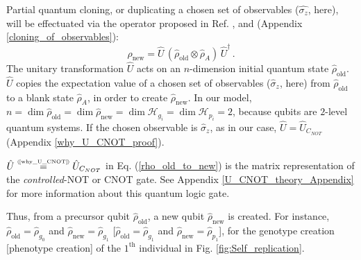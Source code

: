 \documentclass[11pt]{article}
\numberwithin{equation}{section} %
\numberwithin{figure}{section} %
\newcommand\numeq[1] %
  {\stackrel{\scriptscriptstyle(\mkern-1.5mu#1\mkern-1.5mu)}{=}}
\begin{document}

Partial quantum cloning, or duplicating a chosen set of observables ($\hat{\sigma_z}$, here), will be effectuated via the operator proposed in Ref. \cite[p.~2, Eq.~(1b) \& (3c)]{AL_in_QT}, \cite[p.~2, Eq.~(7)]{Bio_Cloning} and \cite[p.~2, l.~19]{Ferraro} (Appendix \ref{cloning_of_observables}):
\begin{equation} \label{rho_old_to_new}
\hat{\rho}_{\textrm{new}} = \hat{U}\,(\hat{\rho}_{\textrm{old}}\otimes\hat{\rho}_A)\,\hat{U}^\dagger\,\textrm{.}
\end{equation} 
The unitary transformation $\hat{U}$ acts on an $n$-dimension initial quantum state $\hat{\rho}_{\textrm{old}}$. $\hat{U}$ copies the expectation value of a chosen set of observables ($\hat{\sigma}_z$, here) from $\hat{\rho}_{\textrm{old}}$ to a blank state $\hat{\rho}_A$, in order to create $\hat{\rho}_{\textrm{new}}$.
In our model, $n=\dim \hat{\rho}_{\textrm{old}}= \dim \hat{\rho}_{\textrm{new}}=\dim \mathcal{H}_{g_i}=\dim\mathcal{H}_{p_i}=2$, because qubits are $2$-level quantum systems. If the chosen observable is $\hat{\sigma}_z$, as in our case, $\hat{U}=\hat{U}_{C_{NOT}}$ (Appendix \ref{why_U_CNOT_proof}). 

$\hat{U}\numeq{\textrm{\ref{why_U_CNOT}}}\hat{U}_{C_{NOT}}$ in Eq. (\ref{rho_old_to_new}) is the matrix representation of the \emph{controlled}-NOT or CNOT gate. See Appendix \ref{U_CNOT_theory_Appendix} for more information about this quantum logic gate.

Thus, from a precursor qubit $\hat{\rho}_{\textrm{old}}$, a new qubit $\hat{\rho}_{\textrm{new}}$ is created. For instance, $\hat{\rho}_{\textrm{old}}=\hat{\rho}_{g_0}$ and $\hat{\rho}_{\textrm{new}}=\hat{\rho}_{g_1}$ [$\hat{\rho}_{\textrm{old}}=\hat{\rho}_{g_1}$ and $\hat{\rho}_{\textrm{new}}=\hat{\rho}_{p_1}$], for the {\color{purple}genotype creation} [{\color{orange}phenotype creation}] of the $1^{\textrm{th}}$ individual in Fig. \ref{fig:Self_replication}. 
\end{document}
